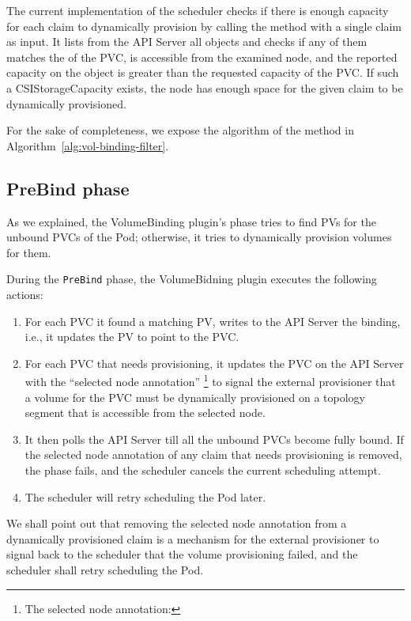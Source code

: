 The current implementation of the scheduler checks if there is enough capacity
for each claim to dynamically provision by calling the  method
with a single claim as input. It lists from the API Server all
 objects and checks if any of them matches the
 of the PVC, is accessible from the examined node, and the
reported capacity on the object is greater than the requested capacity of the
PVC. If such a CSIStorageCapacity exists, the node has enough space for the
given claim to be dynamically provisioned.


For the sake of completeness, we expose the algorithm of the 
method in Algorithm~\ref{alg:vol-binding-filter}.

\subsection*{PreBind phase}

As we explained, the VolumeBinding plugin's  phase tries to find PVs
for the unbound PVCs of the Pod; otherwise, it tries to dynamically provision
volumes for them.

During the \texttt{PreBind} phase, the VolumeBidning plugin executes the
following actions:
\begin{enumerate}
      \item For each PVC it found a matching PV, writes to the API Server the
            binding, i.e., it updates the PV to point to the PVC.
      \item For each PVC that needs provisioning, it updates the PVC on the API
            Server with the ``selected node annotation'' \footnote{The selected
                  node annotation: } to signal
            the external provisioner that a volume for the PVC must be
            dynamically provisioned on a topology segment that is accessible
            from the selected node.
      \item  It then polls the API Server till all the unbound PVCs become fully
            bound. If the selected node annotation of any claim that needs
            provisioning is removed, the  phase fails, and the
            scheduler cancels the current scheduling attempt.
      \item The scheduler will retry scheduling the Pod later.
\end{enumerate}


We shall point out that removing the selected node annotation from a dynamically
provisioned claim is a mechanism for the external provisioner to signal back to
the scheduler that the volume provisioning failed, and the scheduler shall retry
scheduling the Pod.




